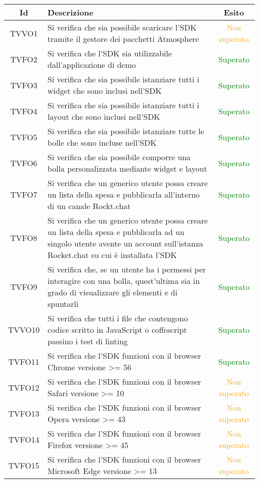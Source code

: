 \begin{center}
	\begin{longtable}{|c|>{\centering}m{10cm}|c|}\hline
		Id & Descrizione & Esito\\ \hline
		TVVO1 & Si verifica che sia possibile scaricare l'SDK tramite il gestore dei pacchetti Atmosphere & \textcolor{Orange}{Non superato}\\ \hline
		TVFO2 & Si verifica che l'SDK sia utilizzabile dall'applicazione di demo & \textcolor{Green}{Superato}\\ \hline
		TVFO3 & Si verifica che sia possibile istanziare tutti i widget che sono inclusi nell'SDK & \textcolor{Green}{Superato}\\ \hline
		TVFO4 & Si verifica che sia possibile istanziare tutti i layout che sono inclusi nell'SDK & \textcolor{Green}{Superato}\\ \hline
		TVFO5 & Si verifica che sia possibile istanziare tutte le bolle che sono incluse nell'SDK & \textcolor{Green}{Superato}\\ \hline
		TVFO6 & Si verifica che sia possibile comporre una bolla personalizzata mediante widget e layout & \textcolor{Green}{Superato}\\ \hline
		TVFO7 & Si verifica che un generico utente possa creare un lista della spesa e pubblicarla all'interno di un canale Rockt.chat & \textcolor{Green}{Superato}\\ \hline
		TVFO8 & Si verifica che un generico utente possa creare un lista della spesa e pubblicarla ad un singolo utente avente un account sull'istanza Rocket.chat su cui è installata l'SDK & \textcolor{Green}{Superato}\\ \hline
		TVFO9 & Si verifica che, se un utente ha i permessi per interagire con una bolla, quest'ultima sia in grado di visualizzare gli elementi e di spuntarli & \textcolor{Green}{Superato}\\ \hline
		TVVO10 & Si verifica che tutti i file che contengono codice scritto in JavaScript o coffescript passino i test di linting & \textcolor{Green}{Superato}\\ \hline
		TVFO11 & Si verifica che l'SDK funzioni con il browser Chrome versione >= 56 & \textcolor{Green}{Superato}\\ \hline
		TVFO12 & Si verifica che l'SDK funzioni con il browser Safari versione >= 10 & \textcolor{Orange}{Non superato}\\ \hline
		TVFO13 & Si verifica che l'SDK funzioni con il browser Opera versione >= 43 & \textcolor{Orange}{Non superato}\\ \hline
		TVFO14 & Si verifica che l'SDK funzioni con il browser Firefox versione >= 45 & \textcolor{Orange}{Non superato}\\ \hline
		TVFO15 & Si verifica che l'SDK funzioni con il browser Microsoft Edge versione >= 13 & \textcolor{Orange}{Non superato}\\ \hline
	\end{longtable}
\end{center}
